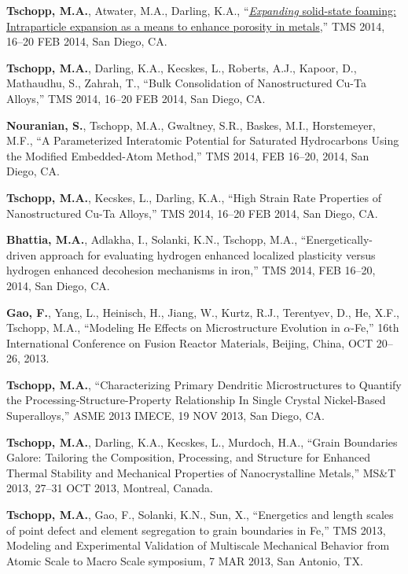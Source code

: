 \begin{cvlist}
\item
\textbf{Tschopp, M.A.}, Atwater, M.A., Darling, K.A., ``\href{http://dx.doi.org/10.13140/2.1.2893.3921}{\textit{Expanding} solid-state foaming: Intraparticle expansion as a means to enhance porosity in metals},''  TMS 2014, 16--20 FEB 2014, San Diego, CA.

\item
\textbf{Tschopp, M.A.}, Darling, K.A., Kecskes, L., Roberts, A.J., Kapoor, D., Mathaudhu, S., Zahrah, T., ``Bulk Consolidation of Nanostructured Cu-Ta Alloys,''  TMS 2014, 16--20 FEB 2014, San Diego, CA.

\item
\textbf{Nouranian, S.}, {Tschopp, M.A.}, Gwaltney, S.R., Baskes, M.I.,  Horstemeyer, M.F., ``A Parameterized Interatomic Potential for Saturated Hydrocarbons Using the Modified Embedded-Atom Method,'' TMS 2014, FEB 16--20, 2014, San Diego, CA.

\item
\textbf{Tschopp, M.A.}, Kecskes, L., Darling, K.A., ``High Strain Rate Properties of Nanostructured Cu-Ta Alloys,'' TMS 2014, 16--20 FEB 2014, San Diego, CA.

\item
\textbf{Bhattia, M.A.}, Adlakha, I., Solanki, K.N., {Tschopp, M.A.}, ``Energetically-driven approach for evaluating hydrogen enhanced localized plasticity versus hydrogen enhanced decohesion mechanisms in iron,'' TMS 2014, FEB 16--20, 2014, San Diego, CA.

\item
\textbf{Gao, F.}, Yang, L., Heinisch, H., Jiang, W., Kurtz, R.J., Terentyev, D., He, X.F., {Tschopp, M.A.}, ``Modeling He Effects on Microstructure Evolution in $\alpha$-Fe,'' 16th International Conference on Fusion Reactor Materials, Beijing, China, OCT 20--26, 2013.

\item
\textbf{Tschopp, M.A.}, ``Characterizing Primary Dendritic Microstructures to Quantify the Processing-Structure-Property Relationship In Single Crystal Nickel-Based Superalloys,'' ASME 2013 IMECE, 19 NOV 2013, San Diego, CA.

\item
\textbf{Tschopp, M.A.}, Darling, K.A., Kecskes, L., Murdoch, H.A.,  ``Grain Boundaries Galore: Tailoring the Composition, Processing, and Structure for Enhanced Thermal Stability and Mechanical Properties of Nanocrystalline Metals,'' MS\&T 2013, 27--31 OCT 2013, Montreal, Canada.

\item
\textbf{Tschopp, M.A.}, Gao, F., Solanki, K.N., Sun, X., ``Energetics and length scales of point defect and element segregation to grain boundaries in Fe,'' TMS 2013, Modeling and Experimental Validation of Multiscale Mechanical Behavior from Atomic Scale to Macro Scale symposium, 7 MAR 2013, San Antonio, TX.


\end{cvlist}

